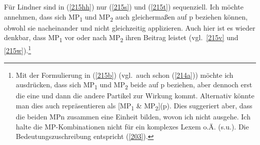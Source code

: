 Für Lindner sind in (\ref{215hh}) nur (\ref{215s}) und (\ref{215t}) sequenziell. Ich möchte annehmen, dass sich MP\textsubscript{1} und MP\textsubscript{2} auch gleichermaßen auf p beziehen können, obwohl sie nacheinander und nicht gleichzeitig applizieren. Auch hier ist es wieder denkbar, dass MP\textsubscript{1} vor oder nach MP\textsubscript{2} ihren Beitrag leistet (vgl.\ \ref{215v} und \ref{215w}).\footnote{Mit der Formulierung in (\ref{215b}) (vgl.\ auch schon (\ref{214a})) möchte ich ausdrücken, dass sich MP\textsubscript{1} und MP\textsubscript{2} beide auf p beziehen, aber dennoch erst die eine und dann die andere Partikel zur Wirkung kommt. Alternativ könnte man dies auch repräsentieren als [MP\textsubscript{1} \&  MP\textsubscript{2}](p). Dies suggeriert aber, dass die beiden MPn zusammen eine Einheit bilden, wovon ich nicht ausgehe. Ich halte die MP-Kom\-bi\-na\-ti\-on\-en nicht für ein komplexes Lexem o.Ä. (s.u.). Die Bedeutungszuschreibung entspricht (\ref{203}).}

